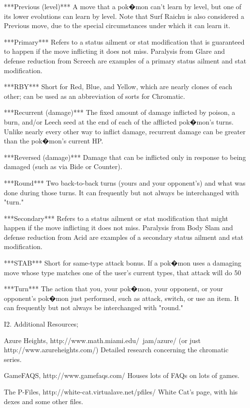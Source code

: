 \documentclass[reprint, aps, prl, paper=A4]{revtex4-1}
\begin{document}
***Previous (level)***
A move that a pok�mon can't learn by level, but one of its lower evolutions can learn by level.
Note that Surf Raichu is also considered a Previous move, due to the special circumstances
under which it can learn it.

***Primary***
Refers to a status ailment or stat modification that is guaranteed to happen if the move
inflicting it does not miss. Paralysis from Glare and defense reduction from Screech are
examples of a primary status ailment and stat modification.

***RBY***
Short for Red, Blue, and Yellow, which are nearly clones of each other; can be used as an
abbreviation of sorts for Chromatic.

***Recurrent (damage)***
The fixed amount of damage inflicted by poison, a burn, and/or Leech seed at the end of each of
the afflicted pok�mon's turns. Unlike nearly every other way to inflict damage, recurrent
damage can be greater than the pok�mon's current HP.

***Reversed (damage)***
Damage that can be inflicted only in response to being damaged (such as via Bide or Counter).

***Round***
Two back-to-back turns (yours and your opponent's) and what was done during those turns. It can
frequently but not always be interchanged with "turn."

***Secondary***
Refers to a status ailment or stat modification that might happen if the move inflicting it
does not miss. Paralysis from Body Slam and defense reduction from Acid are examples of a
secondary status ailment and stat modification.

***STAB***
Short for same-type attack bonus. If a pok�mon uses a damaging move whose type matches one of
the user's current types, that attack will do 50%

***Turn***
The action that you, your pok�mon, your opponent, or your opponent's pok�mon just performed,
such as attack, switch, or use an item. It can frequently but not always be interchanged with
"round."


I2. Additional Resources;

Azure Heights, http://www.math.miami.edu/~jam/azure/ (or just http://www.azureheights.com/)
Detailed research concerning the chromatic series.

GameFAQS, http://www.gamefaqs.com/
Houses lots of FAQs on lots of games.

The P-Files, http://white-cat.virtualave.net/pfiles/
White Cat's page, with his dexes and some other files.
\end{document}
